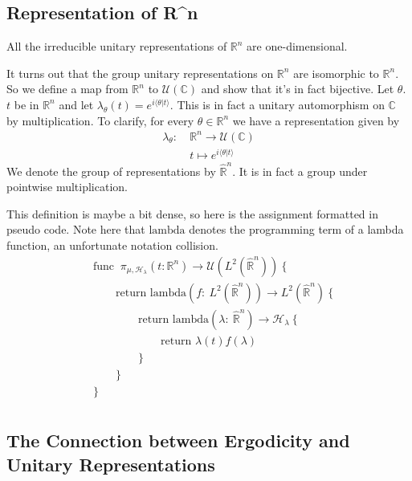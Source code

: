 \documentclass[
]{article}
\begin{document}
\hypertarget{representation-of-rn}{%
\subsection{Representation of R\^{}n}\label{representation-of-rn}}


All the irreducible unitary
representations of \(\mathbb{R}^n\) are one-dimensional.

It turns out that the group unitary representations on \(\mathbb{R}^n\)
are isomorphic to \(\mathbb{R}^n\). So we define a map from
\(\mathbb{R}^n\) to \(\mathcal{U}(\mathbb{C})\) and show that it's in
fact bijective. Let \(\theta\). \(t\) be in \(\mathbb{R}^n\) and let
\(\lambda_{\theta}(t) = e^{i\langle \theta | t \rangle}\). This is in
fact a unitary automorphism on \(\mathbb{C}\) by multiplication. To
clarify, for every \(\theta \in \mathbb{R}^n\) we have a representation
given by
  \begin{align*}
  \lambda_{\theta}:\ & \mathbb{R}^n \rightarrow \mathcal{U}(\mathbb{C}) \\
  & t \mapsto e^{i \langle \theta | t \rangle}
  \end{align*}
We denote the group of representations by \(\hat{\mathbb{R}}^n\). It
is in fact a group under pointwise multiplication.



This definition is maybe a bit dense, so here is the assignment
formatted in pseudo code. Note here that \(\text{lambda}\) denotes the
programming term of a lambda function, an unfortunate notation
collision.
\begin{align*}
& \text{func }\ \pi_{\mu,\mathscr{H}_{\lambda}}(t: \mathbb{R}^n) \rightarrow \mathcal{U}(L^2(\hat{\mathbb{R}}^n)) \ \{ \\
& \qquad \text{return lambda}(f:\ L^2(\hat{\mathbb{R}}^n)) \rightarrow L^2(\hat{\mathbb{R}}^n) \ \{ \\
& \qquad \qquad \text{return lambda}(\lambda:\ \hat{\mathbb{R}}^n) \rightarrow \mathscr{H}_{\lambda} \ \{ \\
& \qquad \qquad \qquad \text{return }\lambda(t)f(\lambda) \\
& \qquad \qquad \} \\
& \qquad \} \\
& \} \\
\end{align*}

\hypertarget{the-connection-between-ergodicity-and-unitary-representations}{%
\subsection{The Connection between Ergodicity and Unitary
Representations}\label{the-connection-between-ergodicity-and-unitary-representations}}
\end{document}
